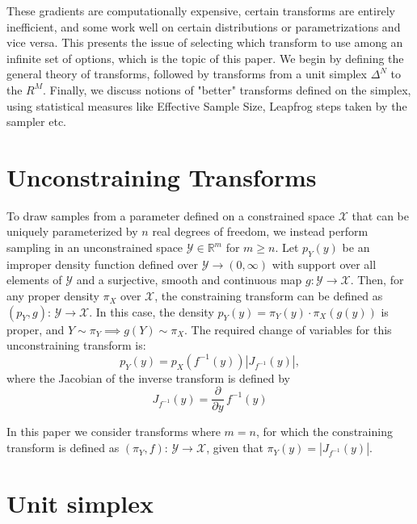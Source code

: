 \documentclass[11pt]{article}
\newcommand{\abs}[1]{\left| #1 \right|}
\newcommand{\absdet}[1]{\abs{#1}}
\begin{document}
These gradients are computationally expensive, certain transforms are entirely inefficient, and some work well on certain distributions or parametrizations and vice versa. This presents the issue of selecting which transform to use
among an infinite set of options, which is the topic of this paper. We begin by defining the general theory of transforms, followed by transforms from a unit simplex $\Delta^N$ to the $R^M$. Finally, we discuss notions of "better" transforms defined on the simplex, using statistical measures like Effective Sample Size, Leapfrog steps taken by the sampler etc.




\section{Unconstraining Transforms}

To draw samples from a parameter defined on a constrained space $\mathcal{X}$ that can be uniquely parameterized by $n$ real degrees of freedom, we instead perform sampling in an unconstrained space $\mathcal{Y} \in \mathbb{R}^m$ for $m \ge n$. Let $p_Y(y)$ be an improper density function defined over $\mathcal{Y} \rightarrow(0, \infty)$ with support over all elements of $\mathcal{Y}$ and a surjective, smooth and continuous map $g: \mathcal{Y} \rightarrow \mathcal{X}$. Then, for any proper density $\pi_{X}$ over $\mathcal{X}$, the constraining transform can be defined as $\left(p_{Y}, g\right)$: $\mathcal{Y} \rightarrow \mathcal{X}$. In this case, the density $p_{Y}(y)=\pi_{Y}(y) \cdot \pi_{X}(g(y))$ is proper, and $Y \sim \pi_Y \implies g(Y) \sim \pi_X$. The required change of variables for this unconstraining transform is:
\[
  p_Y(y) = p_X(f^{-1}(y)) \absdet{J_{f^{-1}}(y)},
\]
where the Jacobian of the inverse transform is defined by
\[
  J_{f^{-1}}(y) = \frac{\partial}{\partial y} \, f^{-1}(y)
\]

In this paper we consider transforms where $m = n$, for which the constraining transform is defined as $(\pi_Y, f)$: $\mathcal{Y} \rightarrow \mathcal{X}$, given that $\pi_{Y}(y)=\absdet{J_{f^{-1}}(y)}$.



\section{Unit simplex}
\end{document}
